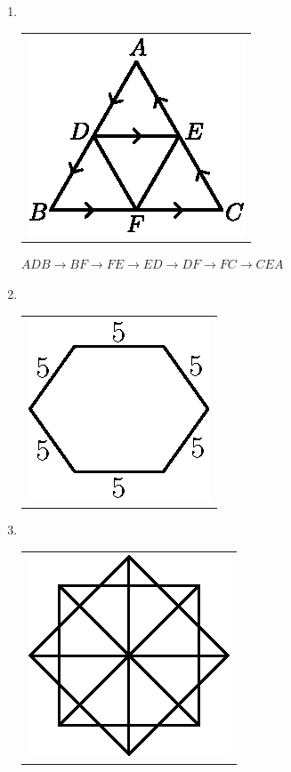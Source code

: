 \begin{enumerate}
\item 
~

  \vskip -0.5cm
  
\begin{tabular}[t]{c}
\centering
\includegraphics{src/figures/ans34.eps}
\end{tabular}

$ADB \to BF \to FE \to ED \to DF \to FC \to CEA$

\bigskip


\item 
~

  \vskip -0.5cm
  
\begin{tabular}[t]{c}
\centering
\includegraphics{src/figures/ans35.eps}
\end{tabular}

\bigskip

\item 
~

  \vskip -0.5cm
  
\begin{tabular}[t]{c}
\centering
\includegraphics{src/figures/ans36.eps}
\end{tabular}


\end{enumerate}
